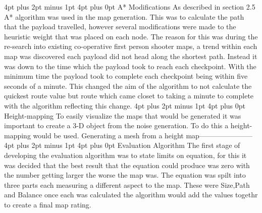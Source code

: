 \documentclass[12pt,a4paper,oneside]{book}
\makeatletter
\renewcommand\section{\@startsection {section}{1}{0mm} %
                               {4pt plus 2pt minus 1pt} %
                               {4pt plus 0pt} %
                               {\bfseries}}
\makeatother
\begin{document}
\section{A* Modifications}
As described in section 2.5 A* algorithm was used in the map generation. This was to calculate the path that the payload travelled, however several modifications were made to the heuristic weight that was placed on each node. The reason for this was during the re-search into existing co-operative first person shooter maps\cite{Overwa}, a trend within each map was discovered each payload did not head along the shortest path. Instead it was down to the time which the payload took to reach each checkpoint. With the minimum time the payload took to complete each checkpoint being within five seconds of a minute. This changed the aim of the algorithm to not calculate the quickest route value but route which came closet to taking a minute to complete with the algorithm reflecting this change.
\vspace{5mm} 
\newline
\section{Height-mapping}
To easily visualize the maps that would be generated it was important to create a 3-D object from the noise generation. To do this a height-mapping would be used. Generating a mesh from a height map-----------------------  
\section{Evaluation Algorithm}
The first  stage of developing the evaluation algorithm was to state limits on equation, for this it was decided that the best result that the equation could produce was zero with the number getting larger the worse the map was. The equation was spilt into three parts each measuring a different aspect to the map. These were Size,Path and Balance once each was calculated the algorithm would add the values togethr to create a final map rating.   
\end{document}
